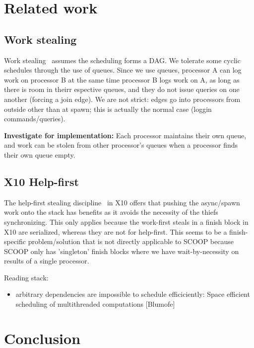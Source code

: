 \documentclass[a4]{article}
\begin{document}
\section{Related work}
\subsection{Work stealing}

Work stealing~\cite{blumofe:1994:scheduling} assumes the scheduling
forms a DAG. 
We tolerate some cyclic schedules through the use of queues.
Since we use queues, processor A can log work on processor B at the 
same time processor B logs work on A, as long as there is room in theirr
espective queues, and they do not issue queries on one another
(forcing a join edge).
We are not strict: edges go into processors from outside other than at spawn;
this is actually the normal case (loggin commands/queries).

\textbf{Investigate for implementation:}
Each processor maintains their own queue, and work can be stolen from
other processor's queues when a processor finds their own queue empty.

\subsection{X10 Help-first}
The help-first stealing discipline~\cite{guo:2009:work} in X10
offers that pushing the async/spawn work onto the stack has benefits
as it avoids the necessity of the thiefs synchronizing.
This only applies because the work-first steals 
in a finish block in X10 are serialized, 
whereas they are not for help-first.
This seems to be a finish-specific problem/solution
that is not directly applicable to SCOOP because
SCOOP only has 'singleton' finish blocks where we have wait-by-necessity
on results of a single  processor.

Reading stack:

\begin{itemize}
\item arbitrary dependencies are impossible to schedule efficiciently:
  Space efficient scheduling of multithreaded computations [Blumofe]
\end{itemize}


\section{Conclusion}

{}

\end{document}
